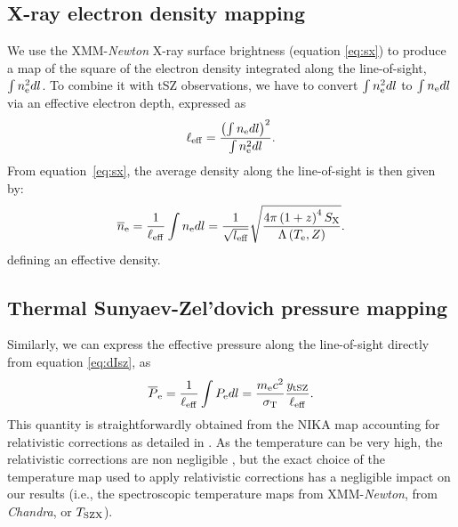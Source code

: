 \documentclass[twocolumn,traditabstract]{aa}
\def\TSZ {T_{\rm SZX}}
\begin{document}
\subsection{X-ray electron density mapping}
We use the XMM-\textit{Newton} X-ray surface brightness (equation \ref{eq:sx}) to produce a map of the square of the electron density integrated along the line-of-sight, $\int n_{\rm e}^2 dl$. To combine it with tSZ observations, we have to convert $\int n_{\rm e}^2 dl$ to $\int n_{\rm e} dl$ via an effective electron depth, expressed as
\begin{equation}
	\ell_{\rm eff} = \frac{\left(\int n_{\rm e} dl\right)^2}{\int n_{\rm e}^2 dl}.
\label{eq:l_eff}
\end{equation}
From equation~\ref{eq:sx}, the average density along the line-of-sight is then given by:
\begin{equation}
	\overline{n}_{\rm e} = \frac{1}{\ell_{\rm eff}} \int n_{\rm e} dl = \frac{1}{\sqrt{l_{\rm eff}}}\sqrt{\frac{4 \pi \left(1+z\right)^4 S_{\rm X}}{\Lambda\left(T_{\rm e}, Z\right)}}.
\label{eq:pseudo_ne}
\end{equation}
defining an effective density.

\subsection{Thermal Sunyaev-Zel'dovich pressure mapping}
Similarly, we can express the effective pressure along the line-of-sight directly from equation \ref{eq:dIsz}, as
\begin{equation}
	\overline{P}_{\rm e} = \frac{1}{\ell_{\rm eff}} \int P_{\rm e} dl = \frac{m_{\rm e} c^2}{\sigma_{\rm T}} \frac{y_{\rm tSZ}}{\ell_{\rm eff}}.
\label{eq:pseudo_p}
\end{equation}
This quantity is straightforwardly obtained from the NIKA map accounting for relativistic corrections as detailed in \cite{Adam2016b}. As the temperature can be very high, the relativistic corrections are non negligible \citep{Pointecouteau1998,Itoh2003}, but the exact choice of the temperature map used to apply relativistic corrections has a negligible impact on our results (i.e., the spectroscopic temperature maps from XMM-\textit{Newton}, from \textit{Chandra}, or $\TSZ$).

\end{document}
